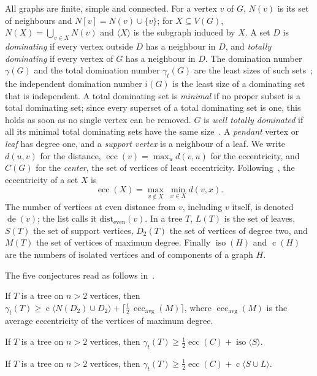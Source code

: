 \documentclass[11pt]{amsart}
\theoremstyle{definition}
\newenvironment{conjecture}[1]{\renewcommand{\theinnerconj}{#1}\innerconj}{\endinnerconj}
\theoremstyle{remark}
\numberwithin{equation}{section}
\newcommand{\gt}{\gamma_t}
\newcommand{\ecc}{\operatorname{ecc}}
\newcommand{\iso}{\operatorname{iso}}
\newcommand{\comp}{\operatorname{c}}
\newcommand{\de}{\operatorname{de}}
\begin{document}
All graphs are finite, simple and connected. For a vertex $v$ of $G$, $N(v)$ is its set of neighbours and $N[v]=N(v)\cup\{v\}$; for $X\subseteq V(G)$, $N(X)=\bigcup_{v\in X}N(v)$ and $\langle X\rangle$ is the subgraph induced by $X$. A set $D$ is \emph{dominating} if every vertex outside $D$ has a neighbour in $D$, and \emph{totally dominating} if every vertex of $G$ has a neighbour in $D$. The domination number $\gamma(G)$ and the total domination number $\gt(G)$ are the least sizes of such sets~\cite{CDH1980,HenningYeo2013}; the independent domination number $i(G)$ is the least size of a dominating set that is independent. A total dominating set is \emph{minimal} if no proper subset is a total dominating set; since every superset of a total dominating set is one, this holds as soon as no single vertex can be removed. $G$ is \emph{well totally dominated} if all its minimal total dominating sets have the same size~\cite{BEG2021}. A \emph{pendant} vertex or \emph{leaf} has degree one, and a \emph{support vertex} is a neighbour of a leaf. We write $d(u,v)$ for the distance, $\ecc(v)=\max_u d(v,u)$ for the eccentricity, and $C(G)$ for the \emph{center}, the set of vertices of least eccentricity. Following~\cite{WOWII}, the eccentricity of a set $X$ is
\[
\ecc(X)=\max_{v\notin X}\ \min_{x\in X} d(v,x).
\]
The number of vertices at even distance from $v$, including $v$ itself, is denoted $\de(v)$; the list calls it $\mathrm{dist}_{\mathrm{even}}(v)$. In a tree $T$, $L(T)$ is the set of leaves, $S(T)$ the set of support vertices, $D_2(T)$ the set of vertices of degree two, and $M(T)$ the set of vertices of maximum degree. Finally $\iso(H)$ and $\comp(H)$ are the numbers of isolated vertices and of components of a graph $H$.

The five conjectures read as follows in~\cite{WOWII}.

\begin{conjecture}{352}\label{c352}
If $T$ is a tree on $n>2$ vertices, then $\gt(T)\ge \comp\langle N(D_2)\cup D_2\rangle+\bigl\lceil\tfrac12\,\ecc_{\mathrm{avg}}(M)\bigr\rceil$, where $\ecc_{\mathrm{avg}}(M)$ is the average eccentricity of the vertices of maximum degree.
\end{conjecture}

\begin{conjecture}{358}\label{c358}
If $T$ is a tree on $n>2$ vertices, then $\gt(T)\ge\tfrac12\ecc(C)+\iso\langle S\rangle$.
\end{conjecture}

\begin{conjecture}{359}\label{c359}
If $T$ is a tree on $n>2$ vertices, then $\gt(T)\ge\tfrac12\ecc(C)+\comp\langle S\cup L\rangle$.
\end{conjecture}
\end{document}
